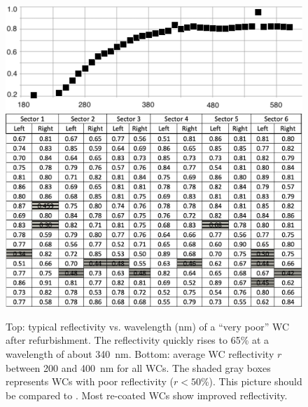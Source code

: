 \begin{figure}
	\centering
	\includegraphics[width=0.98\columnwidth,keepaspectratio]{img/winstoConeSample1Reflectivity.png}
	\includegraphics[width=0.98\columnwidth,keepaspectratio]{img/wcStatusAfter.png}
	\caption{Top: typical reflectivity vs. wavelength (nm) of a ``very poor'' WC after refurbishment. The
          reflectivity quickly rises to 65\% at a wavelength of about 340~nm. Bottom: average WC reflectivity $r$
          between 200 and 400~nm for all WCs. The shaded gray boxes represents WCs with poor reflectivity
          ($r < 50$\%). This picture should be compared to . Most re-coated WCs show improved
          reflectivity.}
	\label{fig:wcStatusAfter}
\end{figure}
